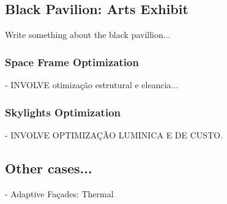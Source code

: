 \subsection{Black Pavilion: Arts Exhibit}

Write something about the black pavillion...

\subsubsection{Space Frame Optimization}

- INVOLVE otimização estrutural e eleancia...

\subsubsection{Skylights Optimization}

- INVOLVE OPTIMIZAÇÃO LUMINICA E DE CUSTO.


\subsection{Other cases...}

- Adaptive Façades: Thermal